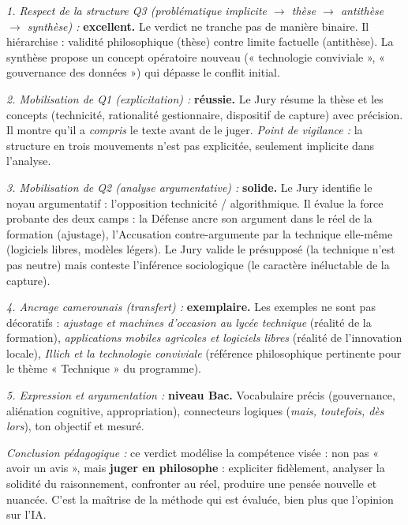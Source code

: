 \documentclass[11pt]{article}
\newcommand{\cle}[1]{{\popxbold\color{popdark}#1}}
\begin{document}
\begin{exoresolu}
\emph{1. Respect de la structure Q3 (problématique implicite $\rightarrow$ thèse $\rightarrow$ antithèse $\rightarrow$ synthèse) :} \textbf{excellent.} Le verdict ne tranche pas de manière binaire. Il \cle{hiérarchise} : validité philosophique (thèse) contre limite factuelle (antithèse). La synthèse propose un \cle{concept opératoire nouveau} (« technologie conviviale », « gouvernance des données ») qui dépasse le conflit initial.

\emph{2. Mobilisation de Q1 (explicitation) :} \textbf{réussie.} Le Jury résume la thèse et les concepts (\cle{technicité}, \cle{rationalité gestionnaire}, \cle{dispositif de capture}) avec précision. Il montre qu'il a \emph{compris} le texte avant de le juger. \emph{Point de vigilance :} la structure en trois mouvements n'est pas explicitée, seulement implicite dans l'analyse.

\emph{3. Mobilisation de Q2 (analyse argumentative) :} \textbf{solide.} Le Jury identifie le \cle{noyau argumentatif} : l'opposition technicité / algorithmique. Il évalue la \cle{force probante} des deux camps : la Défense ancre son argument dans le réel de la formation (ajustage), l'Accusation contre-argumente par la technique elle-même (logiciels libres, modèles légers). Le Jury valide le \cle{présupposé} (la technique n'est pas neutre) mais conteste l'\cle{inférence} sociologique (le caractère inéluctable de la capture).

\emph{4. Ancrage camerounais (transfert) :} \textbf{exemplaire.} Les exemples ne sont pas décoratifs : \emph{ajustage et machines d'occasion au lycée technique} (réalité de la formation), \emph{applications mobiles agricoles et logiciels libres} (réalité de l'innovation locale), \emph{Illich et la technologie conviviale} (référence philosophique pertinente pour le thème « Technique » du programme).

\emph{5. Expression et argumentation :} \textbf{niveau Bac.} Vocabulaire précis (\cle{gouvernance}, \cle{aliénation cognitive}, \cle{appropriation}), connecteurs logiques (\emph{mais, toutefois, dès lors}), ton objectif et mesuré.

\emph{Conclusion pédagogique :} ce verdict modélise la \cle{compétence visée} : non pas « avoir un avis », mais \textbf{juger en philosophe} : expliciter fidèlement, analyser la solidité du raisonnement, confronter au réel, produire une pensée nouvelle et nuancée. C'est la \cle{maîtrise de la méthode} qui est évaluée, bien plus que l'opinion sur l'IA.
\end{exoresolu}
\end{document}
